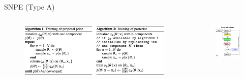 \documentclass[12pt, aspectratio=169]{beamer}
\begin{document}
\begin{frame}{SNPE (Type A)}
    \begin{columns}
        \begin{column}{0.67\textwidth}
            \begin{figure}
                \centering
                \includegraphics[width=\textwidth]{"images/SNPE_algo2.png"}
                \caption{\cite{hermans_likelihood-free_2020}}
            \end{figure}
        \end{column}

        \begin{column}{0.33\textwidth}
            \begin{figure}
                \centering
                \includegraphics[height=0.6\textheight]{"images/SNPE.png"}
                \caption{\cite{cranmer_frontier_2020}}
            \end{figure}
        \end{column}
    \end{columns}
\end{frame}
\end{document}
